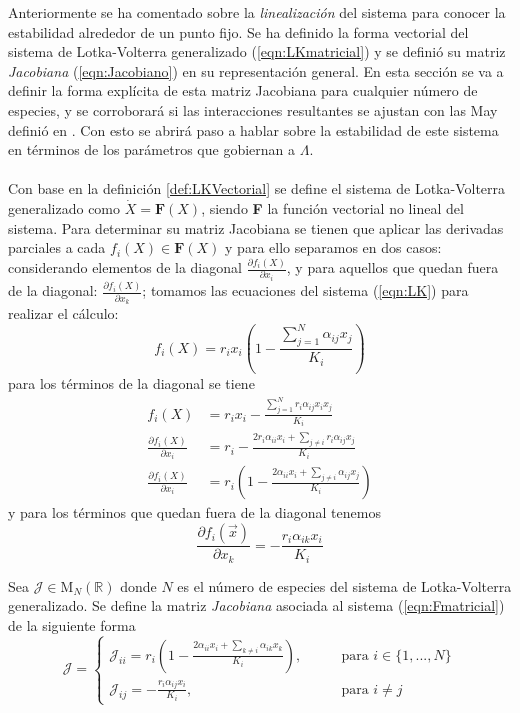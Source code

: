 Anteriormente se ha comentado sobre la \textit{linealización} del sistema para conocer la estabilidad alrededor de un punto fijo. Se ha definido la forma vectorial del sistema de Lotka-Volterra generalizado (\ref{eqn:LKmatricial}) y se definió su matriz \textit{Jacobiana} (\ref{eqn:Jacobiano}) en su representación general. En esta sección se va a definir la forma explícita de esta matriz Jacobiana para cualquier número de especies, y se corroborará si las interacciones resultantes se ajustan con las May definió en \cite{may2019stability}. Con esto se abrirá paso a hablar sobre la estabilidad de este sistema en términos de los parámetros que gobiernan a $\Lambda$.\\
\\
Con base en la definición \ref{def:LKVectorial} se define el sistema de Lotka-Volterra generalizado como $\dot{X}=\textbf{F}(X)$, siendo \textbf{F} la función vectorial no lineal del sistema. Para determinar su matriz Jacobiana se tienen que aplicar las derivadas parciales a cada $f_i(X)\in\mathbf{F}(X)$ y para ello separamos en dos casos: considerando elementos de la diagonal $\frac{\partial f_i(X)}{\partial x_i}$, y para aquellos que quedan fuera de la diagonal: $\frac{\partial f_i(X)}{\partial x_k}$; tomamos las ecuaciones del sistema (\ref{eqn:LK}) para realizar el cálculo:
$$
f_i(X) = r_ix_i\left (1-\frac{\sum_{j=1}^N \alpha_{ij}x_j}{K_i}\right )
$$
para los términos de la diagonal se tiene
\begin{equation}\label{eqn:Jacobiano_ii}
	\begin{split}
			f_i(X) &= r_ix_i - \frac{\sum_{j=1}^N r_i\alpha_{ij}x_ix_j}{K_i} \\
			\frac{\partial f_i(X)}{\partial x_i} &= r_i -
			\frac{2r_i\alpha_{ii}x_i+\sum_{j\neq i} r_i\alpha_{ij}x_j}{K_i}\\
			\frac{\partial f_i(X)}{\partial x_i} &= r_i \left (1-\frac{2\alpha_{ii}x_i+\sum_{j\neq i}\alpha_{ij}x_j}{K_i}\right )
	\end{split}
\end{equation}
y para los términos que quedan fuera de la diagonal tenemos
\begin{equation}\label{eqn:Jacobiano_ij}
		\frac{\partial f_i(\vec{x})}{\partial x_k} = -\frac{r_i\alpha_{ik}x_i}{K_i} 
\end{equation}
\begin{definición}\label{def:MatrizJacobiana}
	Sea $\mathcal{J}\in\mathrm{M}_N(\mathbb{R})$ donde $N$ es el número de especies del sistema de Lotka-Volterra generalizado. Se define la matriz \textit{Jacobiana} asociada al sistema (\ref{eqn:Fmatricial}) de la siguiente forma
	\begin{equation}\label{eqn:MartizJacobiana}
		\mathcal{J}=\begin{cases}
			\mathcal{J}_{ii} = r_i \left (1-\frac{2\alpha_{ii}x_i+\sum_{k\neq i}\alpha_{ik}x_k}{K_i}\right ),\qquad&\text{para }i\in\{1,...,N\}\\
			\mathcal{J}_{ij} = -\frac{r_i\alpha_{ij}x_i}{K_i},\qquad&\text{para }i\neq j
		\end{cases}
	\end{equation}
\end{definición}

